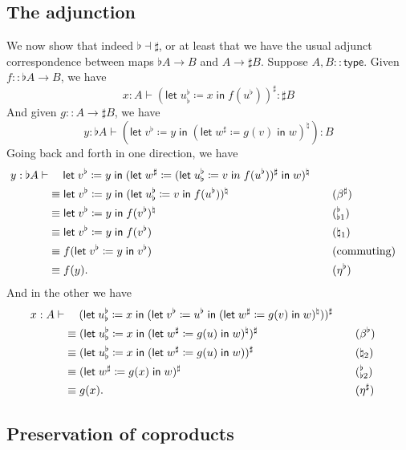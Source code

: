 \documentclass{amsart}
\def\flet#1:=#2in{\mathsf{let}\;#1 \coloneqq #2\;\mathsf{in}\;}
\def\ftype{\mathsf{type}}
\begin{document}
\subsection{The adjunction}
\label{sec:adjunction}

We now show that indeed $\flat\dashv\sharp$, or at least that we have the usual adjunct correspondence between maps $\flat A \to B$ and $A\to\sharp B$.
Suppose $A,B::\ftype$.
Given $f::\flat A \to B$, we have
\[ x:A \vdash (\flet u^\flat_\flat := x in f(u^\flat))^\sharp : \sharp B \]
And given $g::A\to \sharp B$, we have
\[ y:\flat A \vdash (\flet v^\flat := y in (\flet w^\sharp := g(v) in w)^\natural) : B \] 
Going back and forth in one direction, we have
\begin{alignat*}{2}
  y:\flat A \vdash&\hspace{3ex} \flet v^\flat := y in (\flet w^\sharp := (\flet u^\flat_\flat := v in f(u^\flat))^\sharp in w)^\natural\\
  &\equiv \flet v^\flat := y in (\flet u^\flat_\flat := v in f(u^\flat))^\natural
  &&\quad (\beta^\sharp)\\
  &\equiv \flet v^\flat := y in f(v^\flat)^\natural
  &&\quad ({}^\flat_{\flat1})\\
  &\equiv \flet v^\flat := y in f(v^\flat)
  &&\quad (\natural_1)\\
  &\equiv f(\flet v^\flat := y in v^\flat)
  &&\quad \text{(commuting)}\\
  &\equiv f(y).
  &&\quad (\eta^\flat)
\end{alignat*}
And in the other we have 
\begin{alignat*}{2}
  x:A\vdash&\hspace{3ex} (\flet u^\flat_\flat := x in (\flet v^\flat := u^\flat in (\flet w^\sharp := g(v) in w)^\natural))^\sharp\\
  &\equiv (\flet u^\flat_\flat := x in (\flet w^\sharp := g(u) in w)^\natural)^\sharp
  &&\quad (\beta^\flat)\\
  &\equiv (\flet u^\flat_\flat := x in (\flet w^\sharp := g(u) in w))^\sharp
  &&\quad (\natural_2)\\
  &\equiv (\flet w^\sharp := g(x) in w)^\sharp
  &&\quad ({}^\flat_{\flat2})\\
  &\equiv g(x).
  &&\quad (\eta^\sharp)
\end{alignat*}

\subsection{Preservation of coproducts}
\label{sec:pres-copr}
\end{document}
